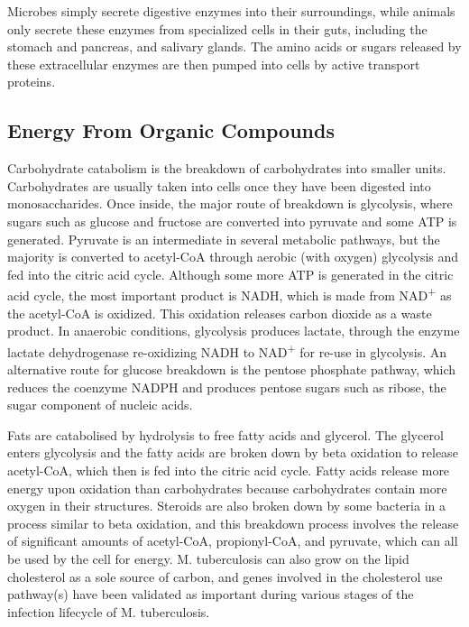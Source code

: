 Microbes simply secrete digestive enzymes into their surroundings, while animals only secrete these enzymes from specialized cells in their guts, including the stomach and pancreas, and salivary glands. The amino acids or sugars released by these extracellular enzymes are then pumped into cells by active transport proteins.

\hypertarget{energy-from-organic-compounds}{%
\subsection{Energy From Organic Compounds}\label{energy-from-organic-compounds}}

Carbohydrate catabolism is the breakdown of carbohydrates into smaller units. Carbohydrates are usually taken into cells once they have been digested into monosaccharides. Once inside, the major route of breakdown is glycolysis, where sugars such as glucose and fructose are converted into pyruvate and some ATP is generated. Pyruvate is an intermediate in several metabolic pathways, but the majority is converted to acetyl-CoA through aerobic (with oxygen) glycolysis and fed into the citric acid cycle. Although some more ATP is generated in the citric acid cycle, the most important product is NADH, which is made from NAD\textsuperscript{+} as the acetyl-CoA is oxidized. This oxidation releases carbon dioxide as a waste product. In anaerobic conditions, glycolysis produces lactate, through the enzyme lactate dehydrogenase re-oxidizing NADH to NAD\textsuperscript{+} for re-use in glycolysis. An alternative route for glucose breakdown is the pentose phosphate pathway, which reduces the coenzyme NADPH and produces pentose sugars such as ribose, the sugar component of nucleic acids.

Fats are catabolised by hydrolysis to free fatty acids and glycerol. The glycerol enters glycolysis and the fatty acids are broken down by beta oxidation to release acetyl-CoA, which then is fed into the citric acid cycle. Fatty acids release more energy upon oxidation than carbohydrates because carbohydrates contain more oxygen in their structures. Steroids are also broken down by some bacteria in a process similar to beta oxidation, and this breakdown process involves the release of significant amounts of acetyl-CoA, propionyl-CoA, and pyruvate, which can all be used by the cell for energy. M. tuberculosis can also grow on the lipid cholesterol as a sole source of carbon, and genes involved in the cholesterol use pathway(s) have been validated as important during various stages of the infection lifecycle of M. tuberculosis.

